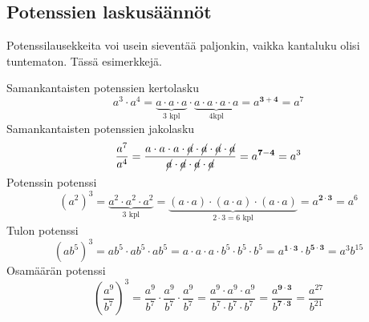 %	
%	
%	

\subsection{Potenssien laskusäännöt}

Potenssilausekkeita voi usein sieventää paljonkin, vaikka kantaluku olisi tuntematon. Tässä esimerkkejä.    
    
    Samankantaisten potenssien kertolasku
	\[
a^3\cdot a^4=\underbrace{a\cdot a\cdot a}_{\text{3 kpl}}\cdot \underbrace{a\cdot a\cdot a\cdot a}_{\text{4kpl}}=a^{\mathbf{3+4}}=a^7
    	\]
    Samankantaisten potenssien jakolasku
	\[
\frac{a^7}{a^4}=\frac{a\cdot a\cdot a\cdot \cancel{a}\cdot \cancel{a}\cdot \cancel{a}\cdot \cancel{a}}	{\cancel{a}\cdot \cancel{a}\cdot \cancel{a}\cdot \cancel{a}}=a^{\mathbf{7-4}}=a^3
    	\]
    Potenssin potenssi
	\[
(a^2)^3=\underbrace{a^2\cdot a^2\cdot a^2}_{3\text{ kpl}}=
\underbrace{(a\cdot a)\cdot (a\cdot a)\cdot (a\cdot a)}_{2\cdot 3=6\text{ kpl}}=a^{\boldsymbol{{2\cdot 3}}}=a^6
\]
    Tulon potenssi
	\[
(ab^5)^3=ab^5\cdot ab^5\cdot ab^5=a\cdot a\cdot a\cdot b^5\cdot b^5\cdot b^5=a^{\mathbf{1\cdot 3}}\cdot b^{\mathbf{5\cdot 3}}=a^3b^{15}
	\]
     Osamäärän potenssi
	\[
	\left(\frac{a^9}{b^7}\right)^3=\frac{a^9}{b^7}\cdot \frac{a^9}{b^7}\cdot \frac{a^9}{b^7}=\frac{a^9\cdot a^9\cdot a^9}{b^7\cdot b^7\cdot b^7}=\frac{a^{\mathbf{9\cdot 3}}}{b^{\mathbf{7\cdot 3}}}=\frac{a^{27}}{b^{21}}
	\]

